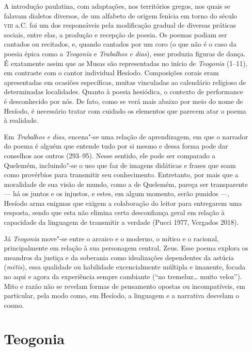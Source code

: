 A introdução paulatina, com adaptações, nos territórios gregos, nos
quais se falavam dialetos diversos, de um alfabeto de origem fenícia em
torno do século \textsc{viii} a.C. foi um dos responsáveis pela modificação
gradual de diversas práticas sociais, entre elas, a produção e recepção
de poesia. Os poemas podiam ser cantados ou recitados, e, quando
cantados por um coro (o que não é o caso da poesia épica como a
\emph{Teogonia} e \emph{Trabalhos e dias}), esse produzia figuras de dança. É exatamente assim que as Musas são representadas no início de \emph{Teogonia} (1--11), em contraste com o
cantor individual Hesíodo. Composições corais eram apresentadas em
ocasiões específicas, muitas vinculadas ao calendário religioso de
determinadas localidades. Quanto à poesia hesiódica, o contexto de
performance é desconhecido por nós. De fato, como se verá mais abaixo
por meio do nome de Hesíodo, é necessário tratar com cuidado os
elementos que parecem atar o poema à realidade.


Em \emph{Trabalhos e dias}, encena"-se uma relação de aprendizagem, em que
o narrador do poema é alguém que entende tudo por si mesmo e dessa
forma pode dar conselhos aos outros (293--95). Nesse sentido, ele pode
ser comparado a Quelemém, incluindo"-se o uso que faz de imagens
didáticas e frases que soam como provérbios para transmitir seu
conhecimento. Entretanto, por mais que a moralidade de sua visão de
mundo, como a de Quelemém, pareça ser transparente --- há os juntos e os
injustos, e estes, em algum momento, serão punidos ---, Hesíodo
arma enigmas que exigem a colaboração do
leitor para entregarem uma resposta, sendo que esta não elimina certa
desconfiança geral em relação à capacidade da linguagem de transmitir a
verdade (Pucci 1977, Vergados 2018).

Já \emph{Teogonia} move"-se entre o arcaico e o moderno, o mítico e o racional,
principalmente em relação à sua personagem central, Zeus.
Esse poema explora os meandros da
justiça e da soberania como idealizações dependentes da astúcia
(\emph{mētis}), essa qualidade ou habilidade excencialmente múltipla e
imanente, focada no aqui e agora da experiência sempre cambiante (``no
tremeluz\ldots{} muito veloz''). Mito e razão não
se revelam formas de pensamento opostas ou incompatíveis, em particular,
pela modo como, em Hesíodo, a linguagem e a narrativa desvelam o cosmo.

\section*{Teogonia}

